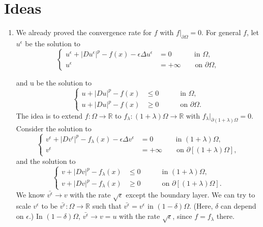 \documentclass[english,reqno]{amsart}
\begin{document}
\section{Ideas}
\begin{enumerate}[label=\arabic*)]
    \item We already proved the convergence rate for $f$ with $f|_{\partial \Omega} =0$. For general $f$, let $u^\epsilon$ be the solution to
\begin{equation}
\left\{
  \begin{aligned}
   u^\epsilon + |Du^\epsilon|^p -f(x) - \epsilon \Delta u^\epsilon &=0 \, \quad \qquad \text{in } \Omega, \\
              u^\epsilon &= +\infty \qquad  \text{on } \partial \Omega,
  \end{aligned}
\right.
\end{equation}

and u be the solution to 
\begin{equation}
\left\{
  \begin{aligned}
   u + |Du|^p -f(x) & \leq 0 \quad \qquad \text{in } \Omega, \\
              u + |Du|^p -f(x) & \geq 0 \quad \qquad \text{on } \partial \Omega.
  \end{aligned}
\right.
\end{equation}
The idea is to extend $f: \Omega \to \mathbb{R}$ to $f_\lambda: (1+\lambda) \Omega \to \mathbb{R}$ with $f_\lambda|_{\partial (1+\lambda)\Omega}=0$. Consider the solution to
\begin{equation}
\left\{
  \begin{aligned}
   v^\epsilon + |Dv^\epsilon|^p -f_\lambda(x) - \epsilon \Delta v^\epsilon &=0 \, \quad \qquad \text{in } (1+\lambda)\Omega, \\
              v^\epsilon &= +\infty \qquad  \text{on } \partial [(1+\lambda)\Omega],
  \end{aligned}
\right.
\end{equation}
and the solution to 
\begin{equation}
\left\{
  \begin{aligned}
   v + |Dv|^p -f_\lambda(x) & \leq 0 \quad \qquad \text{in } (1+\lambda)\Omega, \\
              v + |Dv|^p -f_\lambda(x) & \geq 0 \quad \qquad \text{on } \partial [(1+\lambda)\Omega].
  \end{aligned}
\right.
\end{equation}
We know $\bar{v^\epsilon} \to v$ with the rate $\sqrt{\epsilon}$ except the boundary layer. We can try to scale $v^\epsilon$ to be $\bar{v^\epsilon}: \Omega \to \mathbb{R}$ such that $\bar{v^\epsilon} = v^\epsilon$ in $(1-\delta)\Omega$. (Here, $\delta$ can depend on $\epsilon$.) In $(1-\delta)\Omega$, $\bar{v^\epsilon} \to v=u$ with the rate $\sqrt{\epsilon}$, since $f =f_\lambda$ there. 


\end{enumerate}
\end{document}
